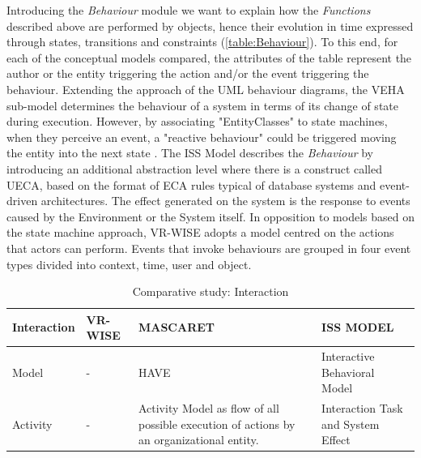 Introducing the \textit{Behaviour} module we want to explain how the \textit{Functions} described above are performed by objects, hence their evolution in time expressed through states, transitions and constraints (\autoref{table:Behaviour}). To this end, for each of the conceptual models compared, the attributes of the table represent the author or the entity triggering the action and/or the event triggering the behaviour. Extending the approach of the UML behaviour diagrams, the VEHA sub-model determines the behaviour of a system in terms of its change of state during execution. However, by associating "EntityClasses" to state machines, when they perceive an event, a "reactive behaviour" could be triggered moving the entity into the next state \cite{chevaillier_semantic_2012}. The ISS Model describes the \textit{Behaviour} by introducing an additional abstraction level where there is a construct called UECA, based on the format of ECA rules typical of database systems and event-driven architectures. The effect generated on the system is the response to events caused by the Environment or the System itself. In opposition to models based on the state machine approach, VR-WISE adopts a model centred on the actions that actors can perform. Events that invoke behaviours are grouped in four event types divided into context, time, user and object. 

\begin{table}
\begin{tabular}{|p{2.2cm}|p{3.1cm}|p{3.1cm}|p{3.1cm}|} 
\hline %
\textbf{Interaction} 
& \textbf{VR-WISE} 
& \textbf{MASCARET}
& \textbf{ISS MODEL} \\ 
\hline
Model
& - 
& HAVE
& Interactive Behavioral Model \\ 
\hline
Activity
& -
& Activity Model as flow of all possible execution of actions by an organizational entity.
& Interaction Task and System Effect \\ 
\hline
\end{tabular} 
\caption{Comparative study: Interaction}
\label{table:Interaction}
\end{table}

